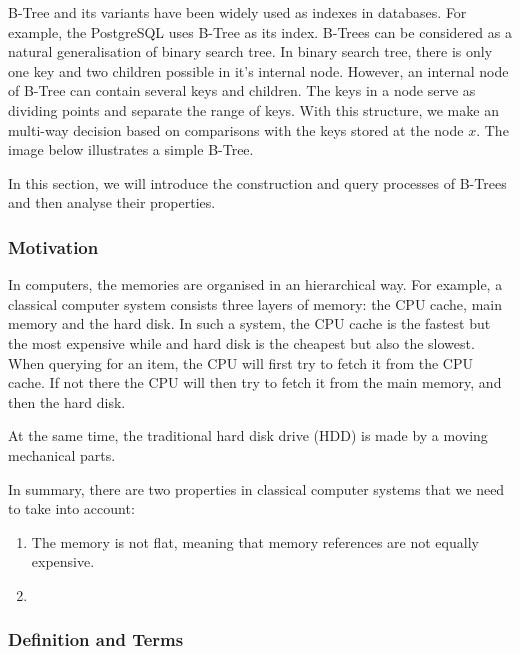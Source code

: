 B-Tree and its variants have been widely used as indexes in
databases. For example, the PostgreSQL uses B-Tree as its index. B-Trees
can be considered as a natural generalisation of binary search tree. In
binary search tree, there is only one key and two children possible in
it's internal node. However, an internal node of B-Tree can contain
several keys and children. The keys in a node serve as dividing points
and separate the range of keys. With this structure, we make an
multi-way decision based on comparisons with the keys stored at the node
$x$. The image below illustrates a simple B-Tree.

In this section, we will introduce the construction and query processes
of B-Trees and then analyse their properties.

\subsubsection{Motivation}

In computers, the memories are organised in an hierarchical way. For example, a classical computer system consists three layers of memory: the CPU cache, main memory and the hard disk. In such a system, the CPU cache is the fastest but the most expensive while and hard disk is the cheapest but also the slowest. When querying for an item, the CPU will first try to fetch it from the CPU cache. If not there the CPU will then try to fetch it from the main memory, and then the hard disk.


At the same time, the traditional hard disk drive (HDD) is made by a moving mechanical parts.



In summary, there are two properties in classical computer systems that we need to take into account:

\begin{enumerate}
	\item The memory is not flat, meaning that memory references are not equally expensive. 
	\item 
\end{enumerate}

\subsubsection{Definition and Terms}

